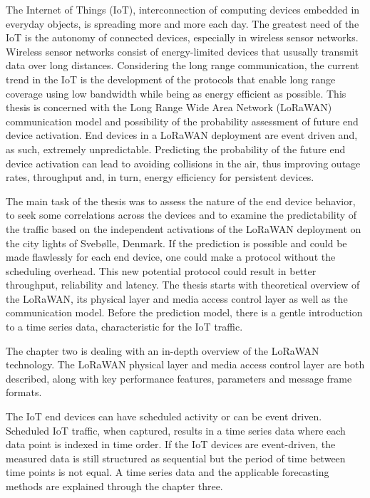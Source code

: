The Internet of Things (IoT), interconnection of computing devices embedded in everyday objects, is spreading more and more each day.
The greatest need of the IoT is the autonomy of connected devices, especially in wireless sensor networks.
Wireless sensor networks consist of energy-limited devices that ususally transmit data over long distances.
Considering the long range communication, the current trend in the IoT is the development of the protocols that enable long range coverage using low bandwidth while being as energy efficient as possible.
This thesis is concerned with the Long Range Wide Area Network (LoRaWAN) communication model and possibility of the probability assessment of future end device activation.
End devices in a LoRaWAN deployment are event driven and, as such, extremely unpredictable. 
Predicting the probability of the future end device activation can lead to avoiding collisions in the air, thus improving outage rates, throughput and, in turn, energy efficiency for persistent devices.



The main task of the thesis was to assess the nature of the end device behavior, to seek some correlations across the devices and to examine the predictability of the traffic based on the independent activations of the LoRaWAN deployment on the city lights of Svebølle, Denmark.
If the prediction is possible and could be made flawlessly for each end device, one could make a protocol without the scheduling overhead.
This new potential protocol could result in better throughput, reliability and latency.
The thesis starts with theoretical overview of the LoRaWAN, its physical layer and media access control layer as well as the communication model. 
Before the prediction model, there is a gentle introduction to a time series data, characteristic for the IoT traffic. 

The chapter two is dealing with an in-depth overview of the LoRaWAN technology. 
The LoRaWAN physical layer and media access control layer are both described, along with key performance features, parameters and message frame formats.

The IoT end devices can have scheduled activity or can be event driven. 
Scheduled IoT traffic, when captured, results in a time series data where each data point is indexed in time order.
If the IoT devices are event-driven, the measured data is still structured as sequential but the period of time between time points is not equal.
A time series data and the applicable forecasting methods are explained through the chapter three. 


